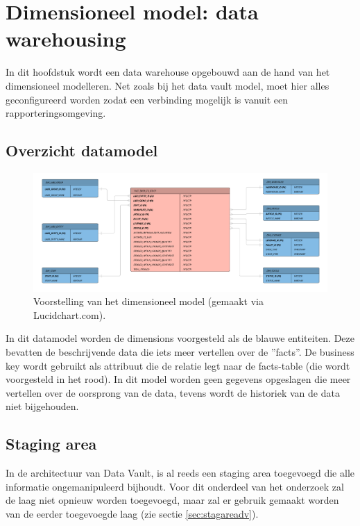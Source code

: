 
\chapter{Dimensioneel model: data warehousing}
\label{ch:dimmodel}
In dit hoofdstuk wordt een data warehouse opgebouwd aan de hand van het dimensioneel modelleren. Net zoals bij het data vault model, moet hier alles geconfigureerd worden zodat een verbinding mogelijk is vanuit een rapporteringsomgeving.

\section{Overzicht datamodel}
\begin{figure}[h]
	\centering
	\includegraphics[scale=0.5]{../images/Dimensioneelmodel.png}
	\caption{Voorstelling van het dimensioneel model (gemaakt via Lucidchart.com).}
	\label{fig:dmdm}
\end{figure}

In dit datamodel worden de dimensions voorgesteld als de blauwe entiteiten. Deze bevatten de beschrijvende data die iets meer vertellen over de ''facts''. De business key wordt gebruikt als attribuut die de relatie legt naar de facts-table (die wordt voorgesteld in het rood). In dit model worden geen gegevens opgeslagen die meer vertellen over de oorsprong van de data, tevens wordt de historiek van de data niet bijgehouden.

\section{Staging area}
In de architectuur van Data Vault, is al reeds een staging area toegevoegd die alle informatie ongemanipuleerd bijhoudt. Voor dit onderdeel van het onderzoek zal de laag niet opnieuw worden toegevoegd, maar zal er gebruik gemaakt worden van de eerder toegevoegde laag (zie sectie \ref{sec:stagareadv}).

